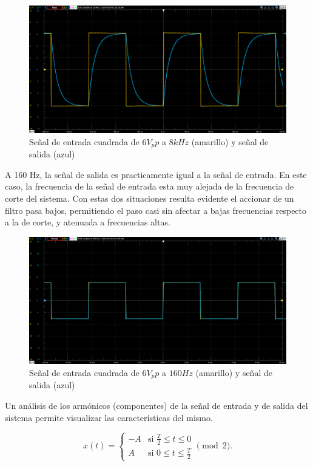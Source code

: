 \begin{figure}[H]
	\centering
	\includegraphics[scale=0.5]{../Informe/Imagenes/Ej2Scope (2).png}
	\caption{Señal de entrada cuadrada de $6V_pp$ a $8kHz$ (amarillo) y señal de salida (azul)}
	\label{ej1cir}
\end{figure}


A 160 Hz, la señal de salida es practicamente igual a la señal de entrada. En este caso, la frecuencia de la señal de entrada esta muy alejada de la frecuencia de corte del sistema. Con estas dos situaciones resulta evidente el accionar de un filtro pasa bajos, permitiendo el paso casi sin afectar a bajas frecuencias respecto a la de corte, y atenuada a frecuencias altas. 

\begin{figure}[H]
	\centering
	\includegraphics[scale=0.5]{../Informe/Imagenes/Ej2Scope160Hz (2).png}
	\caption{Señal de entrada cuadrada de $6V_pp$ a $160Hz$ (amarillo) y señal de salida (azul)}
	\label{ej1cir}
\end{figure}


Un análisis de los armónicos (componentes) de la señal de entrada y de salida del sistema permite visualizar las características del mismo. 

$$ x(t) = \begin{cases} -A &\mbox{si } \frac{T}{2}\leq t\leq 0\\
    A & \mbox{si } 0\leq t\leq \frac{T}{2}\end{cases} \pmod{2}. $$

